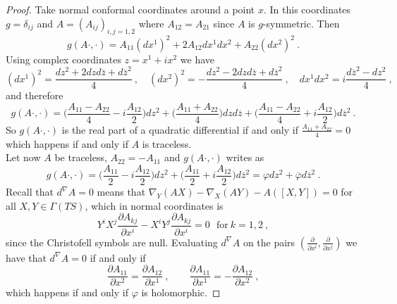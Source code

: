 \begin{proof}
    Take normal conformal coordinates around a point $x$. In this coordinates $g=\delta_{ij}$ and $A = (A_{ij})_{i,j=1,2}$ where $A_{12}=A_{21}$ since $A$ is $g$-symmetric. Then
    \[
        g(A\cdot , \cdot) = A_{11} (dx^1)^2 + 2 A_{12} dx^1 dx^2 + A_{22} (dx^2)^2 \ .
    \]
    Using complex coordinates $z = x^1 + i x^2$ we have
    \[
        (dx^1)^2 = \frac{dz^2 + 2dzd\overline{z} + d\overline{z}^2}{4} \ , \quad (dx^2)^2 = -\frac{dz^2 - 2dzd\overline{z} + d\overline{z}^2}{4} \ , \quad dx^1dx^2 = i \frac{d\overline{z}^2 - dz^2}{4} \ ,
    \]
    and therefore
    \[
        g(A\cdot , \cdot) = \Big( \frac{A_{11} - A_{22}}{4} - i \frac{A_{12}}{2} \Big)dz^2 + \Big( \frac{A_{11} + A_{22}}{4} \Big)dzd\overline{z} +  \Big( \frac{A_{11} - A_{22}}{4} + i \frac{A_{12}}{2} \Big) d\overline{z}^2 \ .
    \]
    So $g(A\cdot , \cdot)$ is the real part of a quadratic differential if and only if $\frac{A_{11} + A_{22}}{4} = 0$ which happens if and only if $A$ is traceless.\\
    Let now $A$ be traceless, $A_{22}=- A_{11}$ and $g(A \cdot, \cdot)$ writes as
    \[
        g(A\cdot , \cdot) = \Big( \frac{A_{11}}{2} - i \frac{A_{12}}{2} \Big)dz^2 +  \Big( \frac{A_{11}}{2} + i \frac{A_{12}}{2} \Big) d\overline{z}^2 = \varphi dz^2 + \overline{\varphi} d \overline{z}^2 \ .
    \]
    Recall that $d^\nabla A = 0$ means that $\nabla_Y (AX) - \nabla_X (AY) - A(\left[X,Y\right]) = 0$ for all $X,Y \in \Gamma(TS)$, which in normal coordinates is
    \begin{equation}
        Y^i X^j \frac{\partial A_{kj}}{\partial x^i} - X^i Y^j \frac{\partial A_{kj}}{\partial x^i} = 0 \ \ \ \text{for} \ k = 1,2 \ ,
    \end{equation}
    since the Christofell symbols are null. Evaluating $d^\nabla A$ on the pairs $(\frac{\partial}{\partial x^i}, \frac{\partial}{\partial x^j})$ we have that $d^\nabla A = 0$ if and only if
    \[
        \frac{\partial A_{11}}{ \partial x^2} = \frac{\partial A_{12}}{ \partial x^1} \ , \qquad \frac{\partial A_{11}}{ \partial x^1} = - \frac{\partial A_{12}}{ \partial x^2} \ ,
    \]
    which happens if and only if $\varphi$ is holomorphic.
\end{proof}

